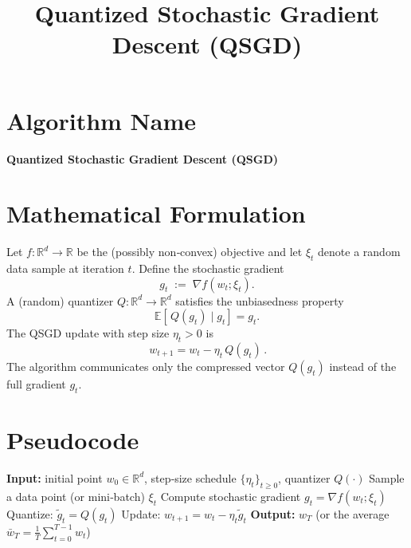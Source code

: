 \documentclass{article}
\title{Quantized Stochastic Gradient Descent (QSGD)}
\author{}
\date{}
\begin{document}
\maketitle

\section*{Algorithm Name}
\textbf{Quantized Stochastic Gradient Descent (QSGD)}

\section*{Mathematical Formulation}
Let $f:\mathbb{R}^d\rightarrow\mathbb{R}$ be the (possibly non‑convex) objective and let $\xi_t$ denote a random data sample at iteration $t$.  
Define the stochastic gradient 
\[
g_t \;:=\; \nabla f(w_t;\xi_t).
\]
A (random) quantizer $Q:\mathbb{R}^d\rightarrow\mathbb{R}^d$ satisfies the unbiasedness property
\[
\mathbb{E}\!\left[\,Q(g_t)\mid g_t\right]=g_t .
\]
The QSGD update with step size $\eta_t>0$ is
\[
\boxed{\,w_{t+1}=w_t-\eta_t\,Q(g_t)\,}.
\]
The algorithm communicates only the compressed vector $Q(g_t)$ instead of the full gradient $g_t$.

\section*{Pseudocode}
\begin{algorithm}[H]
\caption{Quantized Stochastic Gradient Descent}
\begin{algorithmic}[1]
\State \textbf{Input:} initial point $w_0\in\mathbb{R}^d$, step‑size schedule $\{\eta_t\}_{t\ge0}$, quantizer $Q(\cdot)$
    \State Sample a data point (or mini‑batch) $\xi_t$
    \State Compute stochastic gradient $g_t=\nabla f(w_t;\xi_t)$
    \State Quantize: $\tilde g_t = Q(g_t)$
    \State Update: $w_{t+1}=w_t-\eta_t \tilde g_t$
\EndFor
\State \textbf{Output:} $w_T$ (or the average $\bar w_T=\frac1T\sum_{t=0}^{T-1}w_t$)
\end{algorithmic}
\end{algorithm}
\end{document}
